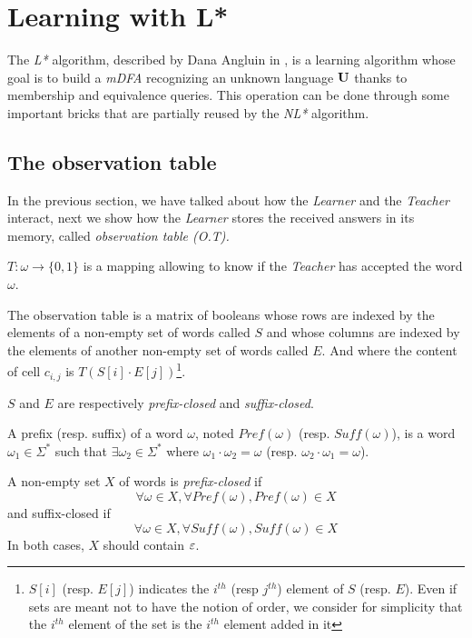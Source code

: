 \section{Learning with L* }
\label{section:L}

The \textit{L*} algorithm, described by Dana Angluin in \cite{LPaper}, is a learning algorithm whose goal is to build a \textit{mDFA} recognizing an unknown language $\mathbf{U}$ thanks to membership and equivalence queries. This operation can be done through some important bricks that are partially reused by the \textit{NL*} algorithm.

\subsection{The observation table}
In the previous section, we have talked about how the \textit{Learner} and the \textit{Teacher} interact, next we show how the \textit{Learner} stores the received answers in its memory, called \textit{observation table (O.T).}

$T: \omega \rightarrow \{0, 1\}$ is a mapping allowing to know if the \textit{Teacher} has accepted the word $\omega$.

\begin{definition}
  The observation table is a matrix of booleans whose rows are indexed by the elements of a non-empty set of words called $S$ and whose columns are indexed by the elements of another non-empty set of words called $E$. And where the content of cell $c_{i,j}$ is $T(S[i] \cdot E[j])$\footnote{$S[i]$ (resp. $E[j]$) indicates the $i^{th}$ (resp $j^{th}$) element of $S$ (resp. $E$). Even if sets are meant not  to have the notion of order, we consider for simplicity that the $i^{th}$ element of the set is the $i^{th}$ element added in it}.
\end{definition}

$S$ and $E$ are respectively \textit{prefix-closed} and \textit{suffix-closed}.

\begin{definition}
  A prefix (resp. suffix) of a word $\omega$, noted $Pref(\omega)$ (resp. $Suff(\omega)$), is a word $\omega_1 \in \Sigma^*$ such that $\exists \omega_2 \in \Sigma^*$ where $\omega_1 \cdot \omega_2 = \omega$ (resp. $\omega_2 \cdot \omega_1 = \omega$).
\end{definition}

\begin{definition}
  A non-empty set $X$ of words is \textit{prefix-closed} if
  \[\forall \omega \in X, \forall Pref(\omega), Pref(\omega) \in X\]
  and suffix-closed if
  \[\forall \omega \in X, \forall Suff(\omega), Suff(\omega) \in X\]
  In both cases, $X$ should contain $\varepsilon$.
\end{definition}

